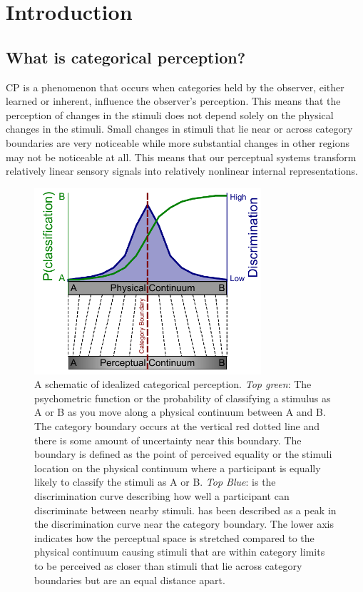 \section{Introduction}
\subsection{What is categorical perception?}

\acf{CP} is a phenomenon that occurs when categories held by the observer, either learned or inherent, influence the observer’s perception. This means that the perception of changes in the stimuli does not depend solely on the physical changes in the stimuli. Small changes in stimuli that lie near or across category boundaries are very noticeable while more substantial changes in other regions may not be noticeable at all. This means that our perceptual systems transform relatively linear sensory signals into relatively nonlinear internal representations.

\begin{figure}[hp] 
  \centering
  \includegraphics[width=0.75\textwidth]{figures/cp_def.pdf}
  \caption[A schematic of idealized categorical perception]
{A schematic of idealized categorical perception. \emph{Top green}: The psychometric function or the probability of classifying a stimulus as A or B as you move along a physical continuum between A and B. The category boundary occurs at the vertical red dotted line and there is some amount of uncertainty near this boundary. The boundary is defined as the point of perceived equality or the stimuli location on the physical continuum where a participant is equally likely to classify the stimuli as A or B. \emph{Top Blue}: is the discrimination curve describing how well a participant can discriminate between nearby stimuli. \CP has been described as a peak in the discrimination curve near the category boundary. The lower axis indicates how the perceptual space is stretched compared to the physical continuum causing stimuli that are within category limits to be perceived as closer than stimuli that lie across category boundaries but are an equal distance apart.}
  \label{fig:cpdef}
\end{figure}

